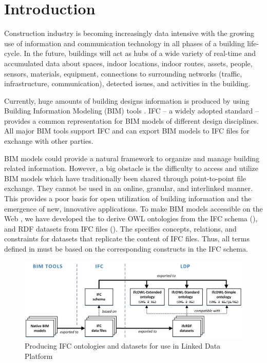 \section{Introduction}
\label{sec:Introduction}

Construction industry is becoming increasingly data intensive with the growing use of
information and communication technology in all phases of a building life-cycle. 
In the future, buildings will act as hubs of a wide variety of real-time and accumulated data about
spaces, indoor locations, indoor routes, assets, people, sensors, materials, equipment, connections
to surrounding networks (traffic, infrastructure, communication), detected issues, and 
activities in the building.

Currently, huge amounts of building designs information is produced by 
using Building Information Modeling (BIM) tools \cite{eastman2011bim}. 
IFC \cite{ISO16739,liebich2010unveiling} -- a widely adopted standard -- provides a common representation for BIM models of 
different design disciplines. All major BIM tools support IFC and can export BIM models to IFC files for exchange with other parties.

BIM models could provide a natural framework to organize and manage building related information. However, a big obstacle is the difficulty to access and utilize BIM models which have traditionally been shared through point-to-point file exchange. They cannot be used in an online, granular, and 
interlinked manner. This provides a poor basis for open utilization of building information and the 
emergence of new, innovative applications.
To make BIM models accessible on the Web \cite{torma2014wobd}, we have developed the 
 to 
derive OWL ontologies from the IFC schema (\ifcowl{}), and RDF datasets from IFC files 
(\ifcrdf{}). The \ifcowl{} specifies concepts, relations, and constraints for \ifcrdf{} datasets that replicate the content of IFC files. 
Thus, all terms defined in \ifcowl{}  must be based on the corresponding constructs in 
the IFC schema. 

\begin{figure}[h]
\centering
\includegraphics{images/ifcOWL-multilayers-6.png}
\caption{Producing IFC ontologies and datasets for use in Linked Data Platform}
\label{fig:ifcOWL-layers}
\end{figure}

